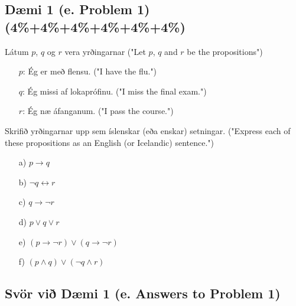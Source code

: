 \subsection*{Dæmi 1 (e. Problem 1) (4\%+4\%+4\%+4\%+4\%+4\%)\label{section:problem1}}
Látum $p$, $q$ og $r$ vera yrðingarnar ("Let $p$, $q$ and $r$ be the propositions")
\begin{itemize}
    \item [$p$:] Ég er með flensu. ("I have the flu.")
    \item [$q$:] Ég missi af lokaprófinu. ("I miss the final exam.")
    \item [$r$:] Ég næ áfanganum. ("I pass the course.")
\end{itemize}
Skrifið yrðingarnar upp sem íslenskar (eða enskar) setningar. ("Express each of these propositions as an English (or Icelandic) sentence.")
\begin{itemize}
    \item [a)] $p \to q$
    \item [b)] $\neg q \leftrightarrow  r$
    \item [c)] $q \to \neg r$
    \item [d)] $p \lor q \lor r$
    \item [e)] $(p \to \neg r) \lor (q \to \neg r)$
    \item [f)] $(p \land q) \lor (\neg q \land r)$
\end{itemize}

\subsection*{Svör við Dæmi 1 (e. Answers to Problem 1)}

\newcommand{\makeAnswerBoxProblemOneA}{
  \begin{tcolorbox}[colframe=black, colback=white, boxrule=0.5pt, arc=0pt, outer arc=0pt, height=1.8cm, width=\linewidth, top=1mm, bottom=1mm, left=1mm, right=1mm]

    
  \end{tcolorbox}
}

\newcommand{\makeAnswerBoxProblemOneB}{
  \begin{tcolorbox}[colframe=black, colback=white, boxrule=0.5pt, arc=0pt, outer arc=0pt, height=1.8cm, width=\linewidth, top=1mm, bottom=1mm, left=1mm, right=1mm]

    
  \end{tcolorbox}
}

